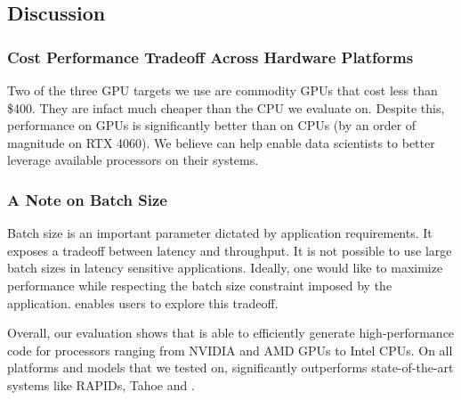 \subsection{Discussion}
\subsubsection*{Cost Performance Tradeoff Across Hardware Platforms}
Two of the three GPU targets we use are commodity GPUs that cost less than \$400. They 
are infact much cheaper than the CPU we evaluate on. Despite this, performance on GPUs
is significantly better than on CPUs (by an order of magnitude on RTX 4060).
We believe \Treebeard{} can help enable data scientists to better leverage 
available processors on their systems.

\subsubsection*{A Note on Batch Size}
Batch size is an important parameter dictated by application requirements. It 
exposes a tradeoff between latency and throughput. It is not possible to use 
large batch sizes in latency sensitive applications. Ideally, one would like 
to maximize performance while respecting the batch size constraint imposed 
by the application. \Treebeard{} enables users to explore this tradeoff.  


Overall, our evaluation shows that \Treebeard{} is able to efficiently generate 
high-performance code for processors ranging from NVIDIA and AMD GPUs to Intel CPUs.
On all platforms and models that we tested on, \Treebeard{} significantly outperforms
state-of-the-art systems like RAPIDs, Tahoe and \TreebeardOLD{}.